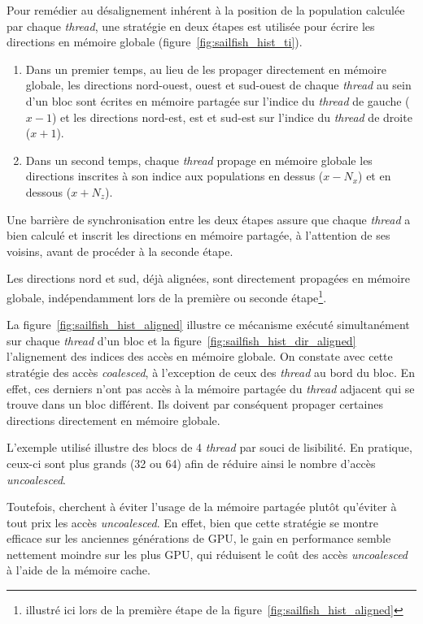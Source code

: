 Pour remédier au désalignement inhérent à la position de la population calculée par chaque \textit{thread}, une stratégie en deux étapes est utilisée pour écrire les directions en mémoire globale (figure~\ref{fig:sailfish_hist_ti}). 
\begin{enumerate}
\item Dans un premier temps, au lieu de les propager directement en mémoire globale, les directions nord-ouest, ouest et sud-ouest de chaque \textit{thread} au sein d'un bloc sont écrites en mémoire partagée sur l'indice du \textit{thread} de gauche ($x-1$) et les directions nord-est, est et sud-est sur l'indice du \textit{thread} de droite ($x+1$).
\item Dans un second temps, chaque \textit{thread} propage en mémoire globale les directions inscrites à son indice aux populations en dessus ($x - N_x$) et en dessous ($x + N_z$).
\end{enumerate}
Une barrière de synchronisation entre les deux étapes assure que chaque \textit{thread} a bien calculé et inscrit les directions en mémoire partagée, à l'attention de ses voisins, avant de procéder à la seconde étape.

Les directions nord et sud, déjà alignées, sont directement propagées en mémoire globale, indépendamment lors de la première ou seconde étape\footnote{illustré ici lors de la première étape de la figure~\ref{fig:sailfish_hist_aligned}}. 

La figure~\ref{fig:sailfish_hist_aligned} illustre ce mécanisme exécuté simultanément sur chaque \textit{thread} d'un bloc et la figure~\ref{fig:sailfish_hist_dir_aligned} l'alignement des indices des accès en mémoire globale. On constate avec cette stratégie des accès \textit{coalesced}, à l'exception de ceux des \textit{thread} au bord du bloc. En effet, ces derniers n'ont pas accès à la mémoire partagée du \textit{thread} adjacent qui se trouve dans un bloc différent. Ils doivent par conséquent propager certaines directions directement en mémoire globale.

L'exemple utilisé illustre des blocs de 4 \textit{thread} par souci de lisibilité. En pratique, ceux-ci sont plus grands (32 ou 64) afin de réduire ainsi le nombre d'accès \textit{uncoalesced}.

Toutefois, \citet{obrecht_global_2011} cherchent à éviter l'usage de la mémoire partagée plutôt qu'éviter à tout prix les accès \textit{uncoalesced}. En effet, bien que cette stratégie se montre efficace sur les anciennes générations de \acs{GPU}, le gain en performance semble nettement moindre sur les plus \acs{GPU}, qui réduisent le coût des accès \textit{uncoalesced} à l'aide de la mémoire cache. 


